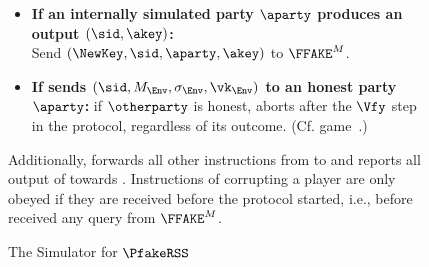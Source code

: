 \begin{figure}[ht!]
\begin{fboxenv}
\begin{minipage}{0.95\textwidth}
\begin{itemize}
\begin{itemize}
      \end{itemize}
      \item
        \textbf{If an internally simulated party $\aparty$ produces an output 
        $(\sid,\akey)$:}\\
        Send $(\NewKey,\sid,\aparty,\akey)$ to $\FFAKE^M$.
      \item
        \textbf{If \Env sends $(\sid,M_\Env,\sigma_\Env,\vk_\Env)$ to an honest party $\aparty$:} if $\otherparty$ is honest, \Sim aborts after the $\Vfy$ step in the protocol, regardless of its outcome. (Cf. game~.)
        
      \end{itemize}
      Additionally, \Sim forwards all other instructions from \Env to \AdvA and reports all output of \AdvA towards \Env. Instructions of corrupting a player are only obeyed if they are received before the protocol started, i.e., before \Sim received any \NewSession query from $\FFAKE^M$.
    \end{minipage}
  \end{fboxenv}
  \caption{The Simulator \Sim for $\PfakeRSS$}\label{fig:sim-FAKERSS}
\end{figure}
